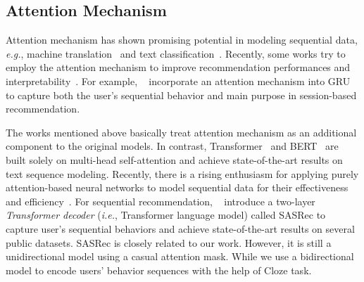  

\subsection{Attention Mechanism}

Attention mechanism has shown promising potential in modeling sequential data, \textit{e.g.}, machine translation~\cite{Bahdanau:iclr2015,Vaswani:nips2017:Attention} and text classification~\cite{Yang:naacl2016:HAN}. 
Recently, some works try to employ the attention mechanism to improve recommendation performances and interpretability~\cite{Li:cikm2017:NAS,Liu:kdd2018:STAMP}.
For example, \citeauthor{Li:cikm2017:NAS}~\cite{Li:cikm2017:NAS} incorporate an attention mechanism into GRU to capture both the user's sequential behavior and main purpose in session-based recommendation.




The works mentioned above basically treat attention mechanism as an additional component to the original models. %
In contrast, Transformer~\cite{Vaswani:nips2017:Attention} and BERT~\cite{Devlin:2018:BERT} are built solely on multi-head self-attention and achieve state-of-the-art results on text sequence modeling.
Recently, there is a rising enthusiasm for applying purely attention-based neural networks to model sequential data for their effectiveness and efficiency~\cite{Lin:iclr2017,Shaw:naacl2018:self,Liu:iclr2018:Generating,Radford:2018:GPT,Radford:2019:Language}.
For sequential recommendation, \citeauthor{Kang:ICDM2018:SAS}~\cite{Kang:ICDM2018:SAS} introduce a two-layer \textit{Transformer decoder} (\textit{i.e.}, Transformer language model) called SASRec to capture user's sequential behaviors and achieve state-of-the-art results on several public datasets.
SASRec is closely related to our work.
However, it is still a unidirectional model using a casual attention mask.
While we use a bidirectional model to encode users' behavior sequences with the help of Cloze task.

